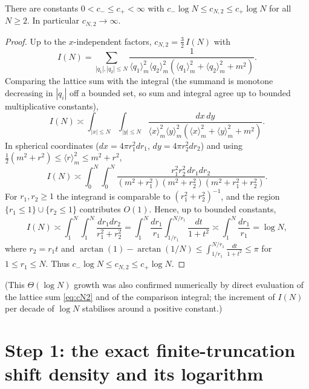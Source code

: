 \begin{qonelemma}\label{lem:logdiv}
There are constants $0<c_-\le c_+<\infty$ with $c_-\log N\le c_{N,2}\le c_+\log N$ for
all $N\ge2$. In particular $c_{N,2}\to\infty$.
\end{qonelemma}
\begin{proof}
Up to the $x$-independent factors, $c_{N,2}=\tfrac32\,I(N)$ with
\[
I(N)=\sum_{|q_1|,|q_2|\le N}\frac{1}{\langle q_1\rangle_m^2\langle q_2\rangle_m^2(\langle q_1\rangle_m^2+\langle q_2\rangle_m^2+m^2)} .
\]
Comparing the lattice sum with the integral (the summand is monotone decreasing in
$|q_i|$ off a bounded set, so sum and integral agree up to bounded multiplicative
constants),
\[
I(N)\asymp\int_{|x|\le N}\!\!\int_{|y|\le N}\frac{dx\,dy}{\langle x\rangle_m^2\langle y\rangle_m^2(\langle x\rangle_m^2+\langle y\rangle_m^2+m^2)} .
\]
In spherical coordinates ($dx=4\pi r_1^2dr_1$, $dy=4\pi r_2^2dr_2$) and using
$\tfrac12(m^2+r^2)\le\langle r\rangle_m^2\le m^2+r^2$,
\[
I(N)\asymp\int_0^N\!\!\int_0^N\frac{r_1^2r_2^2\,dr_1dr_2}{(m^2+r_1^2)(m^2+r_2^2)(m^2+r_1^2+r_2^2)} .
\]
For $r_1,r_2\ge1$ the integrand is comparable to $(r_1^2+r_2^2)^{-1}$, and the region
$\{r_1\le1\}\cup\{r_2\le1\}$ contributes $O(1)$. Hence, up to bounded constants,
\[
I(N)\asymp\int_1^N\!\!\int_1^N\frac{dr_1dr_2}{r_1^2+r_2^2}
=\int_1^N\frac{dr_1}{r_1}\int_{1/r_1}^{N/r_1}\frac{dt}{1+t^2}\asymp\int_1^N\frac{dr_1}{r_1}=\log N,
\]
where $r_2=r_1t$ and $\arctan(1)-\arctan(1/N)\le\int_{1/r_1}^{N/r_1}\frac{dt}{1+t^2}\le\pi$
for $1\le r_1\le N$. Thus $c_-\log N\le c_{N,2}\le c_+\log N$.
\end{proof}

\noindent (This $\Theta(\log N)$ growth was also confirmed numerically by direct
evaluation of the lattice sum \eqref{eq:cN2} and of the comparison integral; the
increment of $I(N)$ per decade of $\log N$ stabilises around a positive constant.)

\section*{Step 1: the exact finite-truncation shift density and its logarithm}

